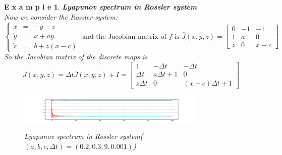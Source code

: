 \documentclass[12pt]{article}
\theoremstyle{plain}
\newtheorem{example}{\textbf{E x a m p l e}}[section]
\begin{document}
\begin{example}\textbf{Lyapunov spectrum in Rossler system}
\\\noindent Now we consider the Rossler system:
$$
\left\{\begin{array}{lll}
\dot x & = & -y-z \\
\dot y & = & x+ay \\
\dot z & = & b+z(x-c)
\end{array}\right. \text{ and the Jacobian matrix of $f$ is } \bar J(x, y, z) = \left[\begin{array}{lll}
0           & -1        & -1        \\
1           & a         & 0         \\
z           & 0         & x-c
\end{array}\right]
$$
So the Jacobian matrix of the discrete maps is 
$$
J(x, y, z) = \Delta t\bar J(x, y, z) + I = \left[\begin{array}{lll}
1                   & -\Delta t         & -\Delta t         \\
\Delta t            & a\Delta t + 1     & 0                 \\
z\Delta t           & 0                 & (x-c)\Delta t + 1
\end{array}\right]
$$
\begin{figure}[H]
\begin{center}
\includegraphics[width=0.8\textwidth]{figure/section5/Lya-spe-Rossler.png} \\
\caption{Lyapunov spectrum in Rossler system($(a, b, c, \Delta t) = (0.2, 0.3, 9, 0.001)$)}
\end{center}
\end{figure}
\end{example}
\end{document}
